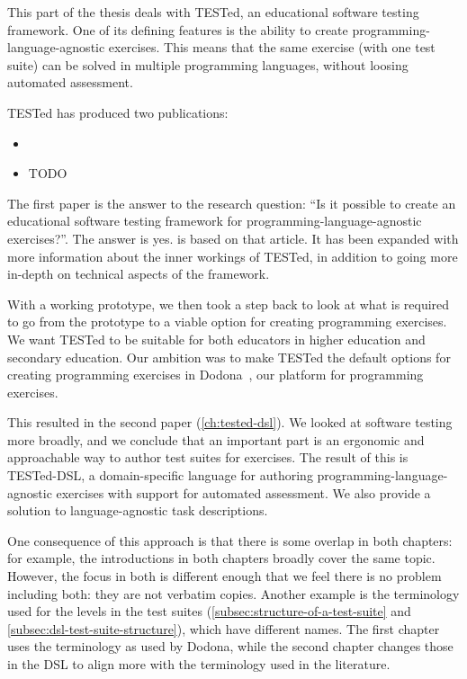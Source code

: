 \documentclass[./main]{subfiles}
\begin{document}
This part of the thesis deals with TESTed, an educational software testing framework.
One of its defining features is the ability to create programming-language-agnostic exercises.
This means that the same exercise (with one test suite) can be solved in multiple programming languages, without loosing automated assessment.

TESTed has produced two publications:

\begin{itemize}
    \item {}
    \item TODO
\end{itemize}

The first paper is the answer to the research question: ``Is it possible to create an educational software testing framework for programming-language-agnostic exercises?''.
The answer is yes.
 is based on that article.
It has been expanded with more information about the inner workings of TESTed, in addition to going more in-depth on technical aspects of the framework.

With a working prototype, we then took a step back to look at what is required to go from the prototype to a viable option for creating programming exercises.
We want TESTed to be suitable for both educators in higher education and secondary education.
Our ambition was to make TESTed the default options for creating programming exercises in Dodona~\autocite{vanpetegemDodonaLearnCode2023}, our platform for programming exercises.

This resulted in the second paper (\cref{ch:tested-dsl}).
We looked at software testing more broadly, and we conclude that an important part is an ergonomic and approachable way to author test suites for exercises.
The result of this is TESTed-DSL, a domain-specific language for authoring programming-language-agnostic exercises with support for automated assessment.
We also provide a solution to language-agnostic task descriptions.

One consequence of this approach is that there is some overlap in both chapters: for example, the introductions in both chapters broadly cover the same topic.
However, the focus in both is different enough that we feel there is no problem including both: they are not verbatim copies.
Another example is the terminology used for the levels in the test suites (\vref{subsec:structure-of-a-test-suite} and \vref{subsec:dsl-test-suite-structure}), which have different names.
The first chapter uses the terminology as used by Dodona, while the second chapter changes those in the DSL to align more with the terminology used in the literature.
\end{document}

